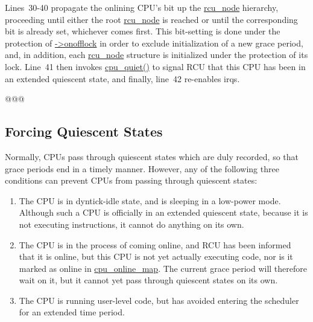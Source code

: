 Lines~30-40 propagate the onlining CPU's bit up the \url{rcu_node}
hierarchy, proceeding until either the root \url{rcu_node} is
reached or until the corresponding bit is already set, whichever
comes first.
This bit-setting is done under the protection of \url{->onofflock}
in order to exclude initialization of a new grace period, and, in addition,
each \url{rcu_node} structure is initialized under the protection
of its lock.
Line~41 then invokes \url{cpu_quiet()} to signal RCU that this
CPU has been in an extended quiescent state, and finally, line~42
re-enables irqs.

 \QuickQuizEnd

@@@


\subsection{Forcing Quiescent States}
\label{app:rcuimpl:rcutreewt:Forcing Quiescent States}

Normally, CPUs pass through quiescent states which are duly recorded,
so that grace periods end in a timely manner.
However, any of the following three conditions can prevent CPUs from
passing through quiescent states:

\begin{enumerate}
\item	The CPU is in dyntick-idle state, and is sleeping in a low-power
	mode.
	Although such a CPU is officially in an extended quiescent state,
	because it is not executing instructions, it cannot do anything
	on its own.
\item	The CPU is in the process of coming online, and RCU has been
	informed that it is online, but this CPU is not yet actually
	executing code, nor is it marked as online in \url{cpu_online_map}.
	The current grace period will therefore wait on it, but it cannot
	yet pass through quiescent states on its own.
\item	The CPU is running user-level code, but has avoided
	entering the scheduler for an extended time period.
\end{enumerate}

